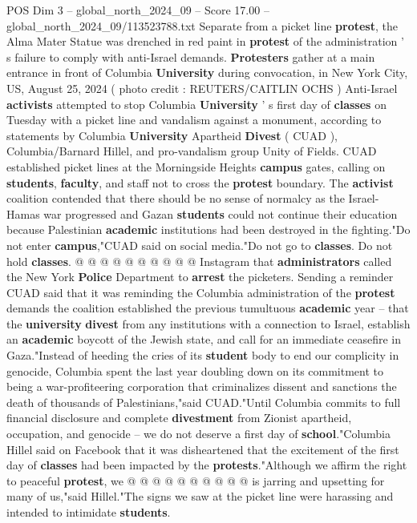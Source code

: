 \begin{textsample}{POS Dim 3 – global\_north\_2024\_09 – Score 17.00 – global\_north\_2024\_09/113523788.txt}  \label{ex:f3_pos_163}
Separate from a picket line \textbf{protest}, the Alma Mater Statue was drenched in red paint in \textbf{protest} of the administration ' s failure to comply with anti-Israel demands. \textbf{Protesters} gather at a main entrance in front of Columbia \textbf{University} during convocation, in New York City, US, August 25, 2024 ( photo credit : REUTERS/CAITLIN OCHS ) Anti-Israel \textbf{activists} attempted to stop Columbia \textbf{University} ' s first day of \textbf{classes} on Tuesday with a picket line and vandalism against a monument, according to statements by Columbia \textbf{University} Apartheid \textbf{Divest} ( CUAD ), Columbia/Barnard Hillel, and pro-vandalism group Unity of Fields.
CUAD established picket lines at the Morningside Heights \textbf{campus} gates, calling on \textbf{students}, \textbf{faculty}, and staff not to cross the \textbf{protest} boundary.
The \textbf{activist} coalition contended that there should be no sense of normalcy as the Israel-Hamas war progressed and Gazan \textbf{students} could not continue their education because Palestinian \textbf{academic} institutions had been destroyed in the fighting."Do not enter \textbf{campus},"CUAD said on social media."Do not go to \textbf{classes}.
Do not hold \textbf{classes}. @ @ @ @ @ @ @ @ @ @ Instagram that \textbf{administrators} called the New York \textbf{Police} Department to \textbf{arrest} the picketers.
Sending a reminder CUAD said that it was reminding the Columbia administration of the \textbf{protest} demands the coalition established the previous tumultuous \textbf{academic} year -- that the \textbf{university} \textbf{divest} from any institutions with a connection to Israel, establish an \textbf{academic} boycott of the Jewish state, and call for an immediate ceasefire in Gaza."Instead of heeding the cries of its \textbf{student} body to end our complicity in genocide, Columbia spent the last year doubling down on its commitment to being a war-profiteering corporation that criminalizes dissent and sanctions the death of thousands of Palestinians,"said CUAD."Until Columbia commits to full financial disclosure and complete \textbf{divestment} from Zionist apartheid, occupation, and genocide -- we do not deserve a first day of \textbf{school}."Columbia Hillel said on Facebook that it was disheartened that the excitement of the first day of \textbf{classes} had been impacted by the \textbf{protests}."Although we affirm the right to peaceful \textbf{protest}, we @ @ @ @ @ @ @ @ @ @ is jarring and upsetting for many of us,"said Hillel."The signs we saw at the picket line were harassing and intended to intimidate \textbf{students}.

\end{textsample}
